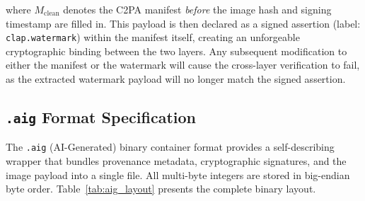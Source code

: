 \documentclass[conference]{IEEEtran}
\begin{document}
where $M_{\text{clean}}$ denotes the C2PA manifest \textit{before} the
image hash and signing timestamp are filled in.
This payload is then declared as a signed assertion (label:
\texttt{clap.watermark}) within the manifest itself, creating an
unforgeable cryptographic binding between the two layers.
Any subsequent modification to either the manifest or the watermark will
cause the cross-layer verification to fail, as the extracted watermark
payload will no longer match the signed assertion.

\subsection{\texttt{.aig} Format Specification}

The \texttt{.aig} (AI-Generated) binary container format provides a
self-describing wrapper that bundles provenance metadata, cryptographic
signatures, and the image payload into a single file.
All multi-byte integers are stored in big-endian byte order.
Table~\ref{tab:aig_layout} presents the complete binary layout.
\end{document}
